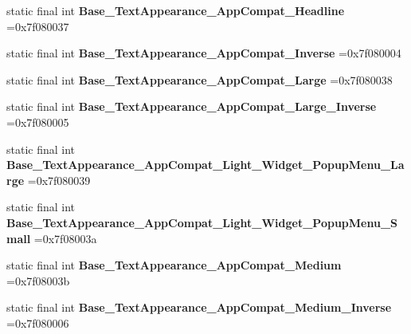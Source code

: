 \begin{DoxyCompactItemize}
\item 
\hypertarget{classcheck_1_1test_1_1_r_1_1style_a1e2fd22e950a0446ded2a65fa4142d96}{}static final int {\bfseries Base\+\_\+\+Text\+Appearance\+\_\+\+App\+Compat\+\_\+\+Headline} =0x7f080037\label{classcheck_1_1test_1_1_r_1_1style_a1e2fd22e950a0446ded2a65fa4142d96}

\item 
\hypertarget{classcheck_1_1test_1_1_r_1_1style_acea5a87a415bce11a1890609b5406c6c}{}static final int {\bfseries Base\+\_\+\+Text\+Appearance\+\_\+\+App\+Compat\+\_\+\+Inverse} =0x7f080004\label{classcheck_1_1test_1_1_r_1_1style_acea5a87a415bce11a1890609b5406c6c}

\item 
\hypertarget{classcheck_1_1test_1_1_r_1_1style_af348a7c42fa565bf31c72cf897d70d2b}{}static final int {\bfseries Base\+\_\+\+Text\+Appearance\+\_\+\+App\+Compat\+\_\+\+Large} =0x7f080038\label{classcheck_1_1test_1_1_r_1_1style_af348a7c42fa565bf31c72cf897d70d2b}

\item 
\hypertarget{classcheck_1_1test_1_1_r_1_1style_a85b268aabca3f8addbcc82468081442e}{}static final int {\bfseries Base\+\_\+\+Text\+Appearance\+\_\+\+App\+Compat\+\_\+\+Large\+\_\+\+Inverse} =0x7f080005\label{classcheck_1_1test_1_1_r_1_1style_a85b268aabca3f8addbcc82468081442e}

\item 
\hypertarget{classcheck_1_1test_1_1_r_1_1style_ae00df87726b9bacfaafebf5a0763c0f9}{}static final int {\bfseries Base\+\_\+\+Text\+Appearance\+\_\+\+App\+Compat\+\_\+\+Light\+\_\+\+Widget\+\_\+\+Popup\+Menu\+\_\+\+Large} =0x7f080039\label{classcheck_1_1test_1_1_r_1_1style_ae00df87726b9bacfaafebf5a0763c0f9}

\item 
\hypertarget{classcheck_1_1test_1_1_r_1_1style_a415f8c2788b4bdb5011f007d4bc0b3cd}{}static final int {\bfseries Base\+\_\+\+Text\+Appearance\+\_\+\+App\+Compat\+\_\+\+Light\+\_\+\+Widget\+\_\+\+Popup\+Menu\+\_\+\+Small} =0x7f08003a\label{classcheck_1_1test_1_1_r_1_1style_a415f8c2788b4bdb5011f007d4bc0b3cd}

\item 
\hypertarget{classcheck_1_1test_1_1_r_1_1style_a17eae2fd8968c85f94575a10e3a4cae0}{}static final int {\bfseries Base\+\_\+\+Text\+Appearance\+\_\+\+App\+Compat\+\_\+\+Medium} =0x7f08003b\label{classcheck_1_1test_1_1_r_1_1style_a17eae2fd8968c85f94575a10e3a4cae0}

\item 
\hypertarget{classcheck_1_1test_1_1_r_1_1style_a91f69d25742572e4f29baec9a5304f7e}{}static final int {\bfseries Base\+\_\+\+Text\+Appearance\+\_\+\+App\+Compat\+\_\+\+Medium\+\_\+\+Inverse} =0x7f080006\label{classcheck_1_1test_1_1_r_1_1style_a91f69d25742572e4f29baec9a5304f7e}


\end{DoxyCompactItemize}
